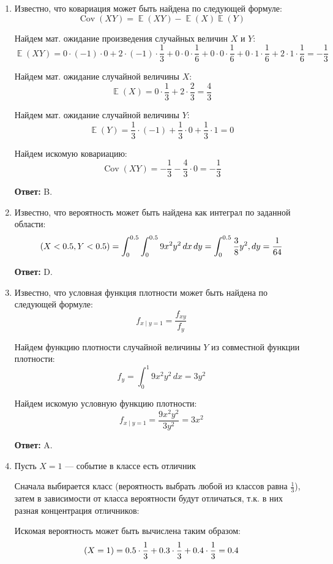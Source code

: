 \documentclass[a4paper]{article} %
\DeclareMathOperator{\Cov}{Cov}
\DeclareMathOperator{\E}{\mathbb{E}}
\let\P\relax
\DeclareMathOperator{\P}{\mathbb{P}}
\begin{document}
\begin{enumerate}
    
    \item
    Известно, что ковариация может быть найдена по следующей формуле:
    \[\Cov(XY) = \E(XY) - \E(X)\E(Y)\]
    
    Найдем мат. ожидание произведения случайных величин $X$ и $Y$:
    \[\E(XY) = 0\cdot(-1)\cdot0 + 2\cdot(-1)\cdot\frac{1}{3} + 0\cdot0\cdot\frac{1}{6} + 0\cdot0\cdot\frac{1}{6} + 0\cdot1\cdot\frac{1}{6} + 2\cdot1\cdot\frac{1}{6} = -\frac{1}{3}\]
    
    Найдем мат. ожидание случайной величины $X$:
    \[\E(X) = 0\cdot\frac{1}{3} + 2\cdot\frac{2}{3} = \frac{4}{3}\]
    
    Найдем мат. ожидание случайной величины $Y$:
    \[\E(Y) = \frac{1}{3} \cdot (-1) + \frac{1}{3} \cdot 0 + \frac{1}{3} \cdot 1 = 0\]
    
    Найдем искомую ковариацию:
    \[\Cov(XY) = -\frac{1}{3} - \frac{4}{3}\cdot0 = -\frac{1}{3}\]
    
    \textbf{Ответ:} B.
    
    
    \item
    Известно, что вероятность может быть найдена как интеграл по заданной области:
    \[\P(X<0.5, Y<0.5) = \int_{0}^{0.5}\int_{0}^{0.5} 9x^2y^2 \,dx\,dy = \int_{0}^{0.5} \frac{3}{8}y^2 ,dy = \frac{1}{64}\]
    
    \textbf{Ответ:} D.
    
    
    \item
    Известно, что условная функция плотности может быть найдена по следующей формуле:
    \[f_{x\mid y=1} = \frac{f_{xy}}{f_{y}} \]
    
    Найдем функцию плотности случайной величины $Y$ из совместной функции плотности:
    \[f_{y} = \int_{0}^{1} 9x^2y^2 \,dx = 3y^2\]
    
    Найдем искомую условную функцию плотности:
    \[f_{x\mid y=1} = \frac{9x^2y^2}{3y^2} = 3x^2\]
    
    \textbf{Ответ:} A.
    
    
    \item
    Пусть $X=1$ — событие в классе есть отличник
    
    Сначала выбирается класс (вероятность выбрать любой из классов равна $\frac{1}{3}$), затем в зависимости от класса вероятности будут отличаться, т.к. в них разная концентрация отличников:
    
    Искомая вероятность может быть вычислена таким образом:
    \[\P(X=1) = 0.5\cdot\frac{1}{3} + 0.3\cdot\frac{1}{3} + 0.4\cdot\frac{1}{3} = 0.4\]
    

\end{enumerate}
\end{document}
